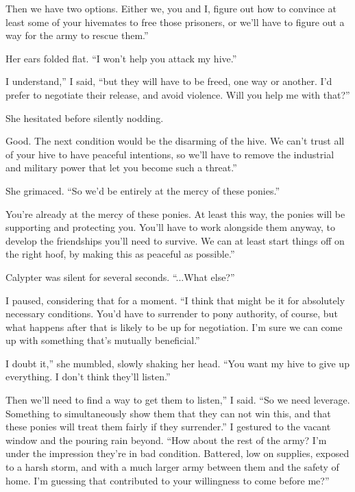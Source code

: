 \leavevmode{}Then we have two options. Either we, you and I, figure out how to convince at least some of your hivemates to free those prisoners, or we’ll have to figure out a way for the army to rescue them.”

Her ears folded flat. “I won’t help you attack my hive.”

\leavevmode{}I understand,” I said, “but they will have to be freed, one way or another. I’d prefer to negotiate their release, and avoid violence. Will you help me with that?”

She hesitated before silently nodding.

\leavevmode{}Good. The next condition would be the disarming of the hive. We can’t trust all of your hive to have peaceful intentions, so we’ll have to remove the industrial and military power that let you become such a threat.”

She grimaced. “So we’d be entirely at the mercy of these ponies.”

\leavevmode{}You’re already at the mercy of these ponies. At least this way, the ponies will be supporting and protecting you. You’ll have to work alongside them anyway, to develop the friendships you’ll need to survive. We can at least start things off on the right hoof, by making this as peaceful as possible.”

Calypter was silent for several seconds. “...What else?”

I paused, considering that for a moment. “I think that might be it for absolutely necessary conditions. You’d have to surrender to pony authority, of course, but what happens after that is likely to be up for negotiation. I’m sure we can come up with something that’s mutually beneficial.”

\leavevmode{}I doubt it,” she mumbled, slowly shaking her head. “You want my hive to give up everything. I don’t think they’ll listen.”

\leavevmode{}Then we’ll need to find a way to get them to listen,” I said. “So we need leverage. Something to simultaneously show them that they can not win this, and that these ponies will treat them fairly if they surrender.” I gestured to the vacant window and the pouring rain beyond. “How about the rest of the army? I’m under the impression they’re in bad condition. Battered, low on supplies, exposed to a harsh storm, and with a much larger army between them and the safety of home. I’m guessing that contributed to your willingness to come before me?”

